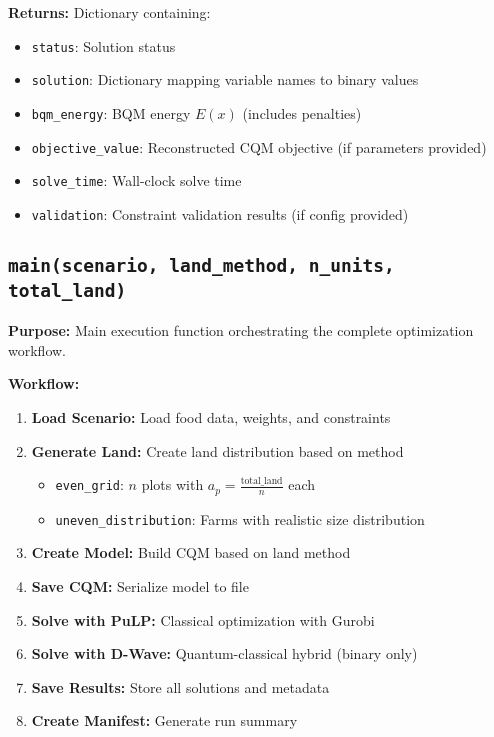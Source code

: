 \documentclass{article}
\begin{document}
\textbf{Returns:} Dictionary containing:
\begin{itemize}
    \item \texttt{status}: Solution status
    \item \texttt{solution}: Dictionary mapping variable names to binary values
    \item \texttt{bqm\_energy}: BQM energy $E(x)$ (includes penalties)
    \item \texttt{objective\_value}: Reconstructed CQM objective (if parameters provided)
    \item \texttt{solve\_time}: Wall-clock solve time
    \item \texttt{validation}: Constraint validation results (if config provided)
\end{itemize}

\subsection{\texttt{main(scenario, land\_method, n\_units, total\_land)}}

\textbf{Purpose:} Main execution function orchestrating the complete optimization workflow.

\textbf{Workflow:}
\begin{enumerate}
    \item \textbf{Load Scenario:} Load food data, weights, and constraints
    \item \textbf{Generate Land:} Create land distribution based on method
    \begin{itemize}
        \item \texttt{even\_grid}: $n$ plots with $a_p = \frac{\text{total\_land}}{n}$ each
        \item \texttt{uneven\_distribution}: Farms with realistic size distribution
    \end{itemize}
    \item \textbf{Create Model:} Build CQM based on land method
    \item \textbf{Save CQM:} Serialize model to file
    \item \textbf{Solve with PuLP:} Classical optimization with Gurobi
    \item \textbf{Solve with D-Wave:} Quantum-classical hybrid (binary only)
    \item \textbf{Save Results:} Store all solutions and metadata
    \item \textbf{Create Manifest:} Generate run summary
\end{enumerate}
\end{document}

